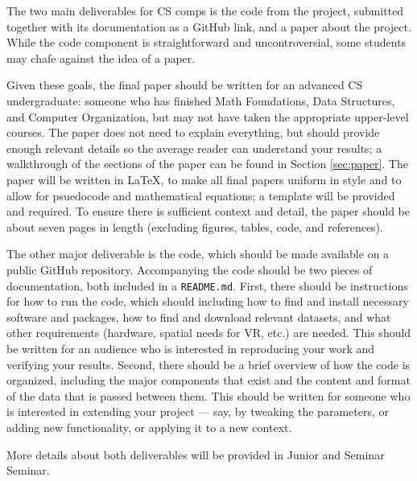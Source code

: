 \documentclass[10pt,twocolumn]{article}
\begin{document}
The two main deliverables for CS comps is the code from the project, submitted together with its documentation as a GitHub link, and a paper about the project.
While the code component is straightforward and uncontroversial, some students may chafe against the idea of a paper.

Given these goals, the final paper should be written for an advanced CS undergraduate: someone who has finished Math Foundations, Data Structures, and Computer Organization, but may not have taken the appropriate upper-level courses.
The paper does not need to explain everything, but should provide enough relevant details so the average reader can understand your results; a walkthrough of the sections of the paper can be found in Section \ref{sec:paper}.
The paper will be written in LaTeX, to make all final papers uniform in style and to allow for psuedocode and mathematical equations; a template will be provided and required.
To ensure there is sufficient context and detail, the paper should be about seven pages in length (excluding figures, tables, code, and references).

The other major deliverable is the code, which should be made available on a public GitHub repository.
Accompanying the code should be two pieces of documentation, both included in a \texttt{README.md}.
First, there should be instructions for how to run the code, which should including how to find and install necessary software and packages, how to find and download relevant datasets, and what other requirements (hardware, spatial needs for VR, etc.) are needed.
This should be written for an audience who is interested in reproducing your work and verifying your results.
Second, there should be a brief overview of how the code is organized, including the major components that exist and the content and format of the data that is passed between them.
This should be written for someone who is interested in extending your project --- say, by tweaking the parameters, or adding new functionality, or applying it to a new context.

More details about both deliverables will be provided in Junior and Seminar Seminar.

\end{document}
